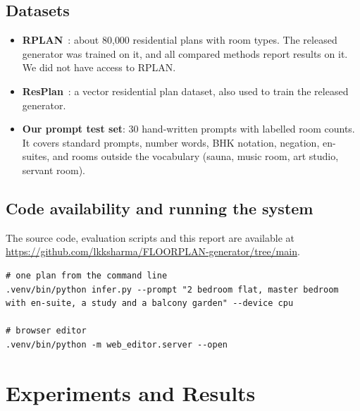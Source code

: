 \documentclass[11pt,a4paper]{article}
\begin{document}
\subsection{Datasets}
\begin{itemize}
  \item \textbf{RPLAN}~\cite{rplan}: about 80{,}000 residential plans with room
        types. The released generator was trained on it, and all compared methods
        report results on it. We did not have access to RPLAN.
  \item \textbf{ResPlan}~\cite{resplan}: a vector residential plan dataset, also
        used to train the released generator.
  \item \textbf{Our prompt test set}: 30 hand-written prompts with labelled room
        counts. It covers standard prompts, number words, BHK notation, negation,
        en-suites, and rooms outside the vocabulary (sauna, music room, art studio,
        servant room).
\end{itemize}

\subsection{Code availability and running the system}
The source code, evaluation scripts and this report are available at
\url{https://github.com/lkksharma/FLOORPLAN-generator/tree/main}.
\begin{lstlisting}
# one plan from the command line
.venv/bin/python infer.py --prompt "2 bedroom flat, master bedroom with en-suite, a study and a balcony garden" --device cpu

# browser editor
.venv/bin/python -m web_editor.server --open
\end{lstlisting}

\section{Experiments and Results}\label{sec:results}
\end{document}
